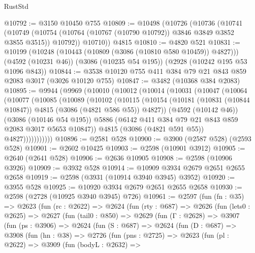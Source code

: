 \begin{lexlean}{RustStd}
\begin{coremodule}
@10792 := @3150 @10450 @755
@10809 := @10498
    (@10726
      (@10736
        (@10741
          (@10749 (@10754 (@10764 (@10767 (@10790 @10792)) @3846 @3849 @3852 @3855 @3515)) @10792))
        @10710))
    @4815
@10810 := @4820 @521
@10831 := @10199
    (@10248 (@10443 (@10809 (@3086 (@10810 @580 @10459)) @4827)))
    (@4592 (@10231 @46))
    (@3086 (@10235 @54 @195))
    (@2928 (@10242 @195 @53 @1096 @843))
@10844 := @3538 @10120 @755 @411 @384 @79 @21 @843 @859 @2083 @3017 (@3026 @10120 @755)
@10847 := @3482 (@10368 @384 @2083)
@10895 := @9944
    (@9969
      (@10010
        (@10012
          (@10014
            (@10031
              (@10047
                (@10064
                  (@10077
                    (@10085
                      (@10089
                        (@10102
                          (@10115
                            (@10154
                              (@10181
                                (@10831 (@10844 @10847))
                                @4815
                                (@3086 (@4821 @586 @55))
                                @4827))
                            (@4592 (@10142 @46))
                            (@3086 (@10146 @54 @195))
                            @5886
                            (@6142 @411 @384 @79 @21 @843 @859 @2083 @3017 @5653 @10847))
                          @4815
                          (@3086 (@4821 @591 @55))
                          @4827)))))))))))
@10896 := @2581 @528
@10900 := @3900 (@2587 @528) (@2593 @528)
@10901 := @2602 @10425
@10903 := @2598 (@10901 @3912)
@10905 := @2640 (@2641 @528)
@10906 := @2636 @10905
@10908 := @2598 (@10906 @3926)
@10909 := @3932 @528
@10914 := @10909 @3934 @2679 @2651 @2655 @2658
@10919 := @2598 (@3931 (@10914 @3940 @3945) @3952)
@10920 := @3955 @528
@10925 := @10920 @3934 @2679 @2651 @2655 @2658
@10930 := @2598 (@2728 (@10925 @3940 @3945) @726)
@10961 := @2597
    (fun (fn : @35) =>
    @2623
      (fun (rc : @2622) =>
      @2624
        (fun (rty : @687) =>
        @2626
          (fun (lets0 : @2625) =>
          @2627
            (fun (tail0 : @850) =>
            @2629
              (fun (Γ : @2628) =>
              @3907
                (fun (ps : @3906) =>
                @2624
                  (fun (S : @687) =>
                  @2624
                    (fun (D : @687) =>
                    @3908
                      (fun (hn : @38) =>
                      @2726
                        (fun (pns : @2725) =>
                        @2623
                          (fun (pl : @2622) =>
                          @3909
                            (fun (bodyL : @2632) =>

\end{coremodule}
\end{lexlean}
